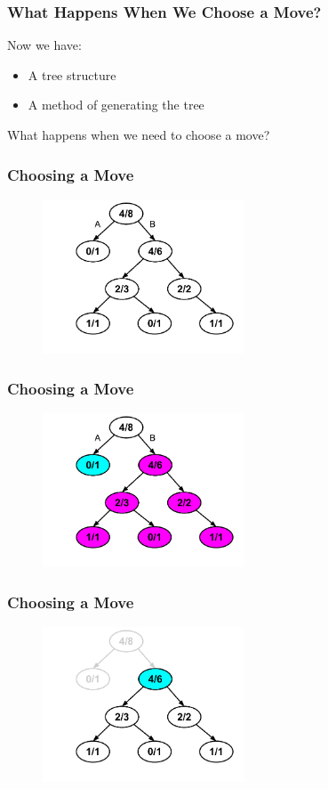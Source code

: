 \documentclass{beamer}
\begin{document}

\begin{frame}
\frametitle{What Happens When We Choose a Move?}
Now we have:
\begin{itemize}
	\item{A tree structure}
	\item{A method of generating the tree}
\end{itemize}
What happens when we need to choose a move?
\end{frame}


\begin{frame}[fragile]
\frametitle{Choosing a Move}
\begin{figure}[h]
	\includegraphics[width=6cm]{Diagrams/MakeAMove/MakeAMoveOne.pdf}
	\centering
\end{figure}
\end{frame}

\begin{frame}[fragile]
\frametitle{Choosing a Move}
\begin{figure}[h]
	\includegraphics[width=6cm]{Diagrams/MakeAMove/MakeAMoveSubTrees.pdf}
	\centering
\end{figure}
\end{frame}

\begin{frame}[fragile]
\frametitle{Choosing a Move}
\begin{figure}[h]
	\includegraphics[width=6cm]{Diagrams/MakeAMove/MakeAMoveTwo.pdf}
	\centering
\end{figure}
\end{frame}
\end{document}
